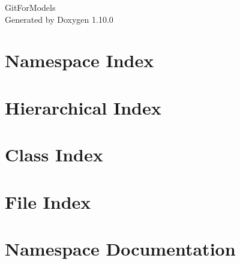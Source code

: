 \documentclass[twoside]{book}
\newcommand{\+}{\discretionary{\mbox{\scriptsize$\hookleftarrow$}}{}{}}
\newcommand{\clearemptydoublepage}{%
    \newpage{\pagestyle{empty}\cleardoublepage}%
  }
\begin{document}
  \raggedbottom
    \hypersetup{pageanchor=false,
                bookmarksnumbered=true,
                pdfencoding=unicode
               }
  \begin{titlepage}
  \vspace*{7cm}
  \begin{center}%
  {\Large Git\+For\+Models}\\
  \vspace*{1cm}
  {\large Generated by Doxygen 1.10.0}\\
  \end{center}
  \end{titlepage}
  \clearemptydoublepage
  \tableofcontents
  \clearemptydoublepage
  \hypersetup{pageanchor=true}

\chapter{Namespace Index}

\chapter{Hierarchical Index}

\chapter{Class Index}

\chapter{File Index}

\chapter{Namespace Documentation}












\end{document}
